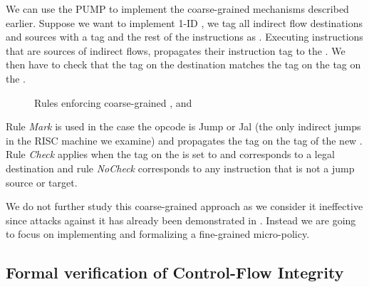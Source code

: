 
We can use the PUMP to implement the coarse-grained \CFI mechanisms described
earlier. Suppose we want to implement 1-ID \CFI, we tag all indirect flow
destinations and sources with a tag \MARK{} and the rest of the instructions as
\UNMARK. Executing instructions that are sources of indirect flows, propagates
their instruction tag to the \pc. We then have to check that the tag on the
destination matches the tag on the tag on the \pc.

\begin{figure}[htb!]
\bigskip

\bigskip

\caption{Rules enforcing coarse-grained \CFI, \NXD and \NWC}
\end{figure}

Rule \emph{Mark} is used in the case the opcode is Jump or Jal (the
only indirect jumps in the RISC machine we examine) and propagates the
\MARKname tag on the tag of the new \pc. Rule \emph{Check} applies
when the tag on the \pc is set to \MARKname and corresponds to a legal
destination and rule \emph{NoCheck} corresponds to any instruction
that is not a jump source or target.

We do not further study this coarse-grained approach as we consider it
ineffective since attacks against it has already been demonstrated in
\cite{outofcontrol_ieeesp2014}. Instead we are going to focus on
implementing and formalizing a fine-grained \CFI micro-policy.


\subsection{Formal verification of Control-Flow Integrity}\label{sec:cfi_verif}

